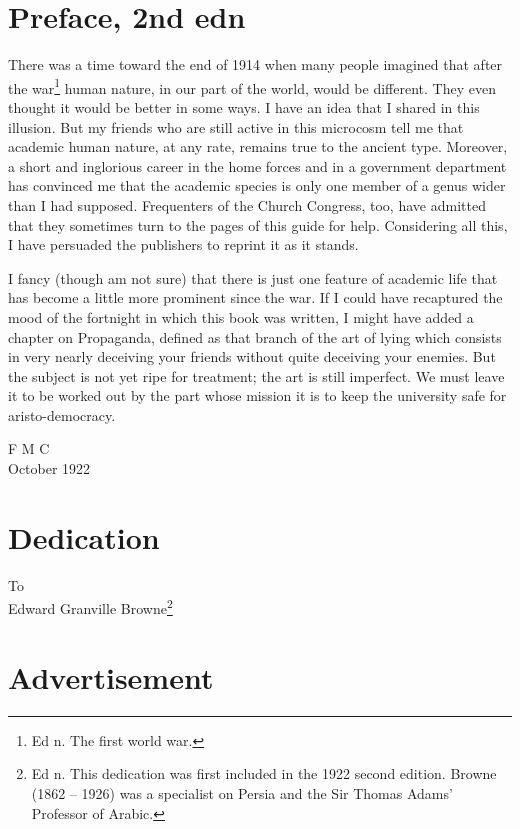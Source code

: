 \documentclass[12pt, oneside, b5paper]{memoir}
\begin{document}
\chapter{Preface, 2nd edn}

There was a time toward the end of 1914 when many people imagined that after the war\footnote{Ed n. The first world war.} human nature, in our part of the world, would be different. They even thought it would be better in some ways. I have an idea that I shared in this illusion. But my friends who are still active in this microcosm tell me that academic human nature, at any rate, remains true to the ancient type. Moreover, a short and inglorious career in the home forces and in a government department has convinced me that the academic species is only one member of a genus wider than I had supposed. Frequenters of the Church Congress, too, have admitted that they sometimes turn to the pages of this guide for help. Considering all this, I have persuaded the publishers to reprint it as it stands.

I fancy (though am not sure) that there is just one feature of academic life that has become a little more prominent since the war. If I could have recaptured the mood of the fortnight in which this book was written, I might have added a chapter on Propaganda, defined as that branch of the art of lying which consists in very nearly deceiving your friends without quite deceiving your enemies. But the subject is not yet ripe for treatment; the art is still imperfect. We must leave it to be worked out by the part whose mission it is to keep the university safe for aristo-democracy.

\begin{flushright}
	F M C \\
	October 1922
\end{flushright}

\chapter{Dedication}
\begin{center}
	To \\
	
	Edward Granville Browne\footnote{Ed n. This dedication was first included in the 1922 second edition. Browne (1862 -- 1926) was a specialist on Persia and the Sir Thomas Adams' Professor of Arabic.}
\end{center}

\chapter{Advertisement}
\end{document}
